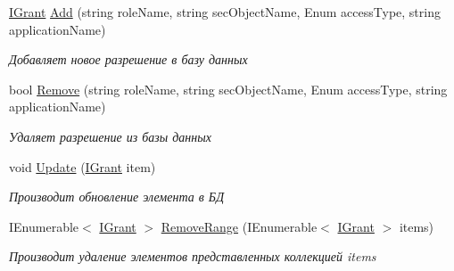\begin{DoxyCompactItemize}
\hyperlink{interface_security_1_1_interfaces_1_1_model_1_1_i_grant}{I\+Grant} \hyperlink{class_security_1_1_entity_framework_1_1_collections_1_1_grant_collection_a090549d86ff2ce4ad4ddd53d6c95e3f7}{Add} (string role\+Name, string sec\+Object\+Name, Enum access\+Type, string application\+Name)
\begin{DoxyCompactList}\small\item\em Добавляет новое разрешение в базу данных \end{DoxyCompactList}\item 
bool \hyperlink{class_security_1_1_entity_framework_1_1_collections_1_1_grant_collection_a072f7e7af7afde3c8754c96c7ebd2f6b}{Remove} (string role\+Name, string sec\+Object\+Name, Enum access\+Type, string application\+Name)
\begin{DoxyCompactList}\small\item\em Удаляет разрешение из базы данных \end{DoxyCompactList}\item 
void \hyperlink{class_security_1_1_entity_framework_1_1_collections_1_1_grant_collection_adc5d41b1b7dbc11165c1fa980a923230}{Update} (\hyperlink{interface_security_1_1_interfaces_1_1_model_1_1_i_grant}{I\+Grant} item)
\begin{DoxyCompactList}\small\item\em Производит обновление элемента в БД \end{DoxyCompactList}\item 
I\+Enumerable$<$ \hyperlink{interface_security_1_1_interfaces_1_1_model_1_1_i_grant}{I\+Grant} $>$ \hyperlink{class_security_1_1_entity_framework_1_1_collections_1_1_grant_collection_a6ba4b048500c75d42eaf11881cbf7023}{Remove\+Range} (I\+Enumerable$<$ \hyperlink{interface_security_1_1_interfaces_1_1_model_1_1_i_grant}{I\+Grant} $>$ items)
\begin{DoxyCompactList}\small\item\em Производит удаление элементов представленных коллекцией items \end{DoxyCompactList}\end{DoxyCompactItemize}
